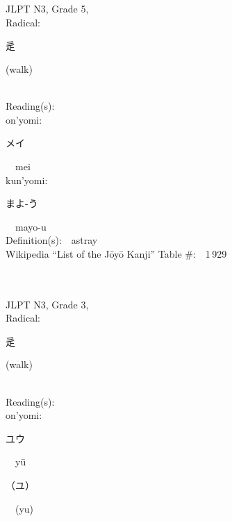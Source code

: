 \begin{multicols}{2}
\ \ \\
{\fontsize{34pt}{40pt}  }\ \ \\  %
{JLPT N3, Grade 5, \\Radical:\ \ {\begin{CJK}{UTF8}{min} 辵 \end{CJK}} (walk) } \\
Reading(s):\ \ \\
{\hspace*{1em}}on'yomi:\ \ \\
{\hspace*{2em}}{\begin{CJK}{UTF8}{min} メイ \end{CJK}}\ \ mei\ \ \\
{\hspace*{1em}}kun'yomi:\ \ \\
{\hspace*{2em}}{\begin{CJK}{UTF8}{min} まよ-う \end{CJK}}\ \ mayo-u\ \ \\
Definition(s):\ \ astray \\
Wikipedia ``List of the J\=oy\=o Kanji'' Table \#:\ \ 1\,929 \\
\ \ \\
{\fontsize{34pt}{40pt}  }\ \ \\  %
{JLPT N3, Grade 3, \\Radical:\ \ {\begin{CJK}{UTF8}{min} 辵 \end{CJK}} (walk) } \\
Reading(s):\ \ \\
{\hspace*{1em}}on'yomi:\ \ \\
{\hspace*{2em}}{\begin{CJK}{UTF8}{min} ユウ \end{CJK}}\ \ y\=u\ \ \\
{\hspace*{2em}}{\begin{CJK}{UTF8}{min} （ユ） \end{CJK}}\ \ (yu)\ \ \\

\end{multicols}
